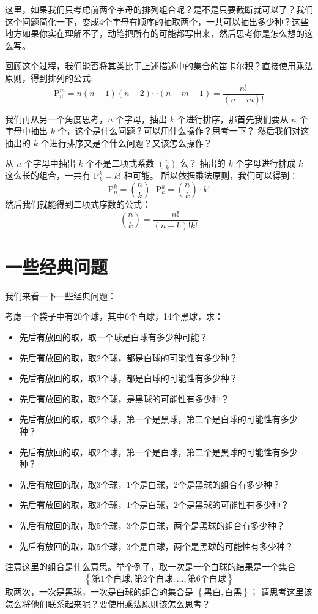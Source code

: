 \documentclass[lang=cn,math=mtpro2,11pt,scheme=chinese,pad]{elegantbook}
\begin{document}
这里，如果我们只考虑前两个字母的排列组合呢？是不是只要截断就可以了？我们这个问题简化一下，变成4个字母有顺序的抽取两个，一共可以抽出多少种？这些地方如果你实在理解不了，动笔把所有的可能都写出来，然后思考你是怎么想的这么写。

回顾这个过程，我们能否将其类比于上述描述中的集合的笛卡尔积？直接使用乘法原则，得到排列的公式:
\[
\text{P}_{n}^{m} = n (n-1) (n-2) \cdots (n-m+1) = \frac{n!}{(n-m)!}
\]

我们再从另一个角度思考，\(n\) 个字母，抽出 \(k\) 个进行排序，那首先我们要从 \(n\) 个字母中抽出 \(k\) 个，这个是什么问题？可以用什么操作？思考一下？
然后我们对这抽出的 \(k\) 个进行排序又是个什么问题？又该怎么操作？

\vspace{10em}

从 \(n\) 个字母中抽出 \(k\) 个不是二项式系数 \(\binom{n}{k}\) 么？
抽出的 \(k\) 个字母进行排成 \(k\) 这么长的组合，一共有 \(\text{P}_{k}^{k} = k!\) 种可能。
所以依据乘法原则，我们可以得到：
\[
\text{P}_{n}^{k} = \binom{n}{k} \cdot \text{P}_{k}^{k} = \binom{n}{k} \cdot k!
\]
然后我们就能得到二项式序数的公式：
\[
\binom{n}{k} = \frac{n!}{(n-k)! k!}
\]

\section{一些经典问题}

我们来看一下一些经典问题：
\begin{example}
  考虑一个袋子中有20个球，其中6个白球，14个黑球，求：
  \begin{itemize}
    \item 先后\textbf{有}放回的取，取一个球是白球有多少种可能？
    \item 先后\textbf{有}放回的取，取2个球，都是白球的可能性有多少种？
    \item 先后\textbf{有}放回的取，取3个球，都是白球的可能性有多少种？
    \item 先后\textbf{有}放回的取，取2个球，是黑球的可能性有多少种？
    \item 先后\textbf{有}放回的取，取2个球，第一个是黑球，第二个是白球的可能性有多少种？
    \item 先后\textbf{有}放回的取，取2个球，第一个是白球，第二个是黑球的可能性有多少种？
    \item 先后\textbf{有}放回的取，取3个球，1个是白球，2个是黑球的组合有多少种？
    \item 先后\textbf{有}放回的取，取3个球，1个是白球，2个是黑球的可能性有多少种？
    \item 先后\textbf{有}放回的取，取5个球，3个是白球，两个是黑球的组合有多少种？
    \item 先后\textbf{有}放回的取，取5个球，3个是白球，两个是黑球的可能性有多少种？
  \end{itemize}
\end{example}
\begin{note}
  注意这里的组合是什么意思。举个例子，取一次是一个白球的结果是一个集合 
  \[
  \left\{ \text{第1个白球}, \text{第2个白球}, \dots, \text{第6个白球} \right\}
  \]
  取两次，一次是黑球，一次是白球的组合的集合是 \(\left\{\text{黑白}, \text{白黑}\right\}\)；
  请思考这里该怎么将他们联系起来呢？要使用乘法原则该怎么思考？
\end{note}
\end{document}
